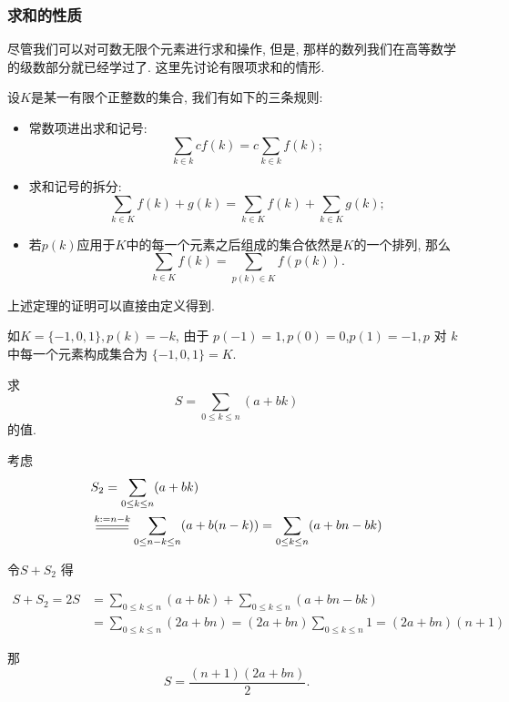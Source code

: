 \documentclass{ctexart}
\begin{document}
\subsubsection{求和的性质}

尽管我们可以对可数无限个元素进行求和操作, 但是, 那样的数列我们在高等数学的级数部分就已经学过了. 这里先讨论有限项求和的情形.

\begin{theorem}\label{thm:sum-prop}
	设$K$是某一有限个正整数的集合, 我们有如下的三条规则:

	\begin{itemize}
		\item 常数项进出求和记号: $$
			      \sum_{k \in k} c f(k)=c \sum_{k \in k} f(k);
		      $$
		\item 求和记号的拆分: $$
			      \sum_{k \in K} f(k)+g(k)=\sum_{k \in K} f(k)+\sum_{k \in K} g(k);
		      $$
		\item 若$p(k)$应用于$K$中的每一个元素之后组成的集合依然是$K$的一个排列, 那么$$
			      \sum_{k \in K} f(k)=\sum_{p(k) \in K} f(p(k)).
		      $$
	\end{itemize}
\end{theorem}

上述定理的证明可以直接由定义得到.

\begin{example}
	如$K=\{-1,0,1\}, p(k)=-k$, 由于 $p(-1)=1, p(0)=0$,$p(1)=-1 , p$ 对 $k$ 中每一个元素构成集合为 $\{-1,0,1\}=K$.
\end{example}

\begin{example}[等差数列求和]
	求 $$
		S=\sum_{0 \leq k \leq n}(a+b k)
	$$的值.

	考虑
	$$
		\begin{aligned}
			 & S_2=\sum_{0 \leq k \leq n}(a+b k)                                                           \\
			 & \varsub{k:=n-k}{0.9cm} \sum_{0 \leq n-k \leq n}(a+b(n-k))=\sum_{0 \leq k \leq n}(a+b n-b k)
		\end{aligned}
	$$

	令$S+S_2$ 得

	$$
		\begin{aligned}
			S+S_2=2 S & =\sum_{0 \leq k \leq n}(a+b k)+\sum_{0 \leq k \leq n}(a+b n-b k)                   \\
			          & =\sum_{0 \leq k \leq n}(2 a+b n)=(2 a+b n) \sum_{0 \leq k \leq n} 1=(2 a+b n)(n+1)
		\end{aligned}
	$$

	那 $$
		S=\frac{(n+1)(2 a+b n)}{2}.
	$$

\end{example}
\end{document}
